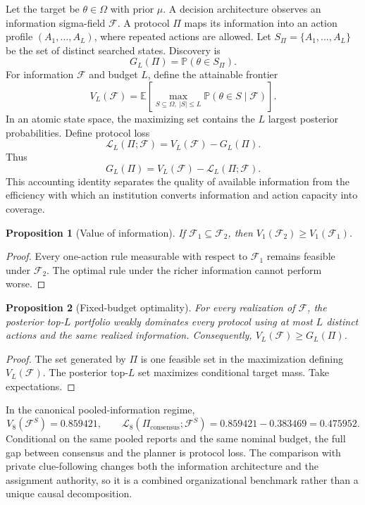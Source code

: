 \documentclass[11pt]{article}
\newtheorem{proposition}{Proposition}
\theoremstyle{definition}
\theoremstyle{remark}
\newcommand{\E}{\mathbb{E}}
\newcommand{\Prob}{\mathbb{P}}
\newcommand{\1}{\mathbf{1}}
\newcommand{\F}{\mathcal{F}}
\newcommand{\Loss}{\mathcal{L}}
\newcommand{\cons}{\mathrm{consensus}}
\begin{document}
Let the target be $\theta\in\Omega$ with prior $\mu$. A decision architecture observes an information sigma-field $\F$. A protocol $\Pi$ maps its information into an action profile $(A_1,\ldots,A_L)$, where repeated actions are allowed. Let $S_\Pi=\{A_1,\ldots,A_L\}$ be the set of distinct searched states. Discovery is
\[
G_L(\Pi)=\Prob(\theta\in S_\Pi).
\]
For information $\F$ and budget $L$, define the attainable frontier
\begin{equation}
V_L(\F)=\E\left[\max_{S\subseteq\Omega,\ |S|\le L}
\Prob(\theta\in S\mid\F)\right].
\label{eq:frontier-general}
\end{equation}
In an atomic state space, the maximizing set contains the $L$ largest posterior probabilities. Define protocol loss
\begin{equation}
\Loss_L(\Pi;\F)=V_L(\F)-G_L(\Pi).
\label{eq:protocol-loss}
\end{equation}
Thus
\[
G_L(\Pi)=V_L(\F)-\Loss_L(\Pi;\F).
\]
This accounting identity separates the quality of available information from the efficiency with which an institution converts information and action capacity into coverage.

\begin{proposition}[Value of information]
\label{prop:voi}
If $\F_1\subseteq\F_2$, then $V_1(\F_2)\ge V_1(\F_1)$.
\end{proposition}

\begin{proof}
Every one-action rule measurable with respect to $\F_1$ remains feasible under $\F_2$. The optimal rule under the richer information cannot perform worse.
\end{proof}

\begin{proposition}[Fixed-budget optimality]
For every realization of $\F$, the posterior top-$L$ portfolio weakly dominates every protocol using at most $L$ distinct actions and the same realized information. Consequently, $V_L(\F)\ge G_L(\Pi)$.
\end{proposition}

\begin{proof}
The set generated by $\Pi$ is one feasible set in the maximization defining $V_L(\F)$. The posterior top-$L$ set maximizes conditional target mass. Take expectations.
\end{proof}

In the canonical pooled-information regime,
\[
V_8(\F^S)=0.859421,
\qquad
\Loss_8(\Pi_{\cons};\F^S)=0.859421-0.383469=0.475952.
\]
Conditional on the same pooled reports and the same nominal budget, the full gap between consensus and the planner is protocol loss. The comparison with private clue-following changes both the information architecture and the assignment authority, so it is a combined organizational benchmark rather than a unique causal decomposition.
\end{document}
